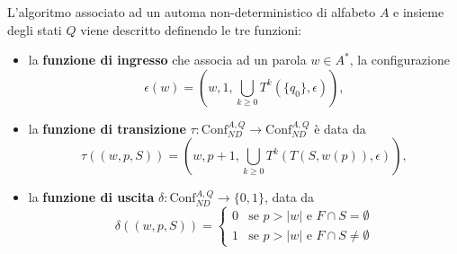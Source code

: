 \begin{defi}
\label{def:17}
L'algoritmo associato ad un automa non-deterministico di alfabeto $A$ e insieme degli stati $Q$ viene descritto definendo le tre funzioni:
\begin{itemize}
\item la \textbf{funzione di ingresso} che associa ad un parola $w \in A^*$, la configurazione
\[
\epsilon(w) = \left(w, 1, \bigcup_{k \geq 0} T^k(\{q_0\}, \epsilon)\right),
\]

\item la \textbf{funzione di transizione} $\tau : \mathrm{Conf}_{ND}^{A,Q} \to \mathrm{Conf}_{ND}^{A,Q}$ è data da
\[
\tau((w,p,S)) = \left(w, p+1, \bigcup_{k \geq 0} T^k(T(S, w(p)), \epsilon)\right),
\]

\item la \textbf{funzione di uscita} $\delta : \mathrm{Conf}_{ND}^{A,Q} \to \{0,1\}$, data da
\[
\delta((w,p,S)) =
\begin{cases}
0 & \text{se } p > |w| \text{ e } F \cap S = \emptyset \\
1 & \text{se } p > |w| \text{ e } F \cap S \neq \emptyset
\end{cases}
\]
\end{itemize}
\end{defi}

